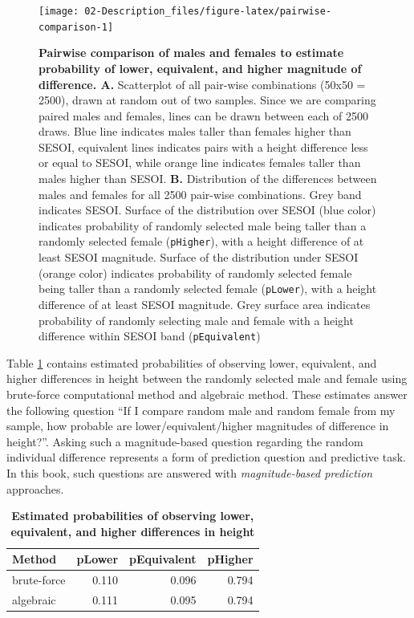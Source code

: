 \documentclass[
]{book}
\begin{document}
\begin{figure}

{\centering \texttt{[image: 02-Description\_files/figure-latex/pairwise-comparison-1]} 

}

\caption{\textbf{Pairwise comparison of males and females to estimate probability of lower, equivalent, and higher magnitude of difference. A.} Scatterplot of all pair-wise combinations (50x50 = 2500), drawn at random out of two samples. Since we are comparing paired males and females, lines can be drawn between each of 2500 draws. Blue line indicates males taller than females higher than SESOI, equivalent lines indicates pairs with a height difference less or equal to SESOI, while orange line indicates females taller than males higher than SESOI. \textbf{B.} Distribution of the differences between males and females for all 2500 pair-wise combinations. Grey band indicates SESOI. Surface of the distribution over SESOI (blue color) indicates probability of randomly selected male being taller than a randomly selected female (\texttt{pHigher}), with a height difference of at least SESOI magnitude. Surface of the distribution under SESOI (orange color) indicates probability of randomly selected female being taller than a randomly selected female (\texttt{pLower}), with a height difference of at least SESOI magnitude. Grey surface area indicates probability of randomly selecting male and female with a height difference within SESOI band (\texttt{pEquivalent})}\label{fig:pairwise-comparison}
\end{figure}



Table \ref{tab:table-magnitude-based-diff} contains estimated probabilities of observing lower, equivalent, and higher differences in height between the randomly selected male and female using brute-force computational method and algebraic method. These estimates answer the following question ``If I compare random male and random female from my sample, how probable are lower/equivalent/higher magnitudes of difference in height?''. Asking such a magnitude-based question regarding the random individual difference represents a form of prediction question and predictive task. In this book, such questions are answered with \emph{magnitude-based prediction} approaches.



\begin{table}

\caption{\label{tab:table-magnitude-based-diff}\textbf{Estimated probabilities of observing lower, equivalent, and higher differences in height}}
\centering
\begin{tabular}[t]{lrrr}
\toprule
Method & pLower & pEquivalent & pHigher\\
\midrule
brute-force & 0.110 & 0.096 & 0.794\\
algebraic & 0.111 & 0.095 & 0.794\\
\bottomrule
\end{tabular}
\end{table}
\end{document}
